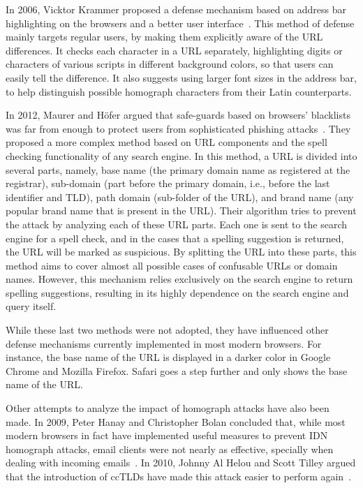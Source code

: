 \documentclass[letterpaper,twocolumn,10pt]{article}
\begin{document}
In 2006, Vicktor Krammer proposed a defense mechanism based on address bar highlighting on the browsers and a better user interface~\cite{krammer2006}.
This method of defense mainly targets regular users, by making them explicitly aware of the URL differences.
It checks each character in a URL separately, highlighting digits or characters of various scripts in different background colors, so that users can easily tell the difference.
It also suggests using larger font sizes in the address bar, to help distinguish possible homograph characters from their Latin counterparts.

In 2012, Maurer and H\"{o}fer argued that safe-guards based on browsers' blacklists was far from enough to protect users from sophisticated phishing attacks~\cite{maurer2012}.
They proposed a more complex method based on URL components and the spell checking functionality of any search engine.
In this method, a URL is divided into several parts, namely, base name (the primary domain name as registered at the registrar), sub-domain (part before the primary domain, i.e., before the last identifier and TLD), path domain (sub-folder of the URL), and brand name (any popular brand name that is present in the URL).
Their algorithm tries to prevent the attack by analyzing each of these URL parts.
Each one is sent to the search engine for a spell check, and in the cases that a spelling suggestion is returned, the URL will be marked as suspicious.
By splitting the URL into these parts, this method aims to cover almost all possible cases of confusable URLs or domain names.
However, this mechanism relies exclusively on the search engine to return spelling suggestions, resulting in its highly dependence on the search engine and query itself.

While these last two methods were not adopted, they have influenced other defense mechanisms currently implemented in most modern browsers.
For instance, the base name of the URL is displayed in a darker color in Google Chrome and Mozilla Firefox.
Safari goes a step further and only shows the base name of the URL.

Other attempts to analyze the impact of homograph attacks have also been made.
In 2009, Peter Hanay and Christopher Bolan concluded that, while most modern browsers in fact have implemented useful measures to prevent IDN homograph attacks, email clients were not nearly as effective, specially when dealing with incoming emails~\cite{hannay2009}.
In 2010, Johnny Al Helou and Scott Tilley argued that the introduction of ccTLDs have made this attack easier to perform again~\cite{al2010}.
\end{document}
